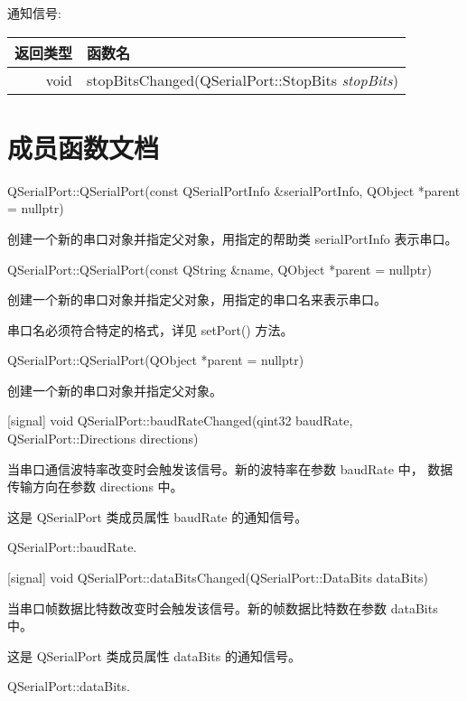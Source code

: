 通知信号:

\begin{tabular}{|r|l|}
\hline
返回类型 &	函数名 \\ 
\hline
void &	stopBitsChanged(QSerialPort::StopBits \emph{stopBits}) \\ 
\hline
\end{tabular}


\section{成员函数文档}

QSerialPort::QSerialPort(const QSerialPortInfo \&serialPortInfo, QObject *parent = nullptr)

创建一个新的串口对象并指定父对象，用指定的帮助类 serialPortInfo 表示串口。

QSerialPort::QSerialPort(const QString \&name, QObject *parent = nullptr)

创建一个新的串口对象并指定父对象，用指定的串口名来表示串口。

串口名必须符合特定的格式，详见 setPort() 方法。

QSerialPort::QSerialPort(QObject *parent = nullptr)

创建一个新的串口对象并指定父对象。

[signal] void QSerialPort::baudRateChanged(qint32 baudRate, QSerialPort::Directions directions)

当串口通信波特率改变时会触发该信号。新的波特率在参数 baudRate 中，
数据传输方向在参数 directions 中。

\begin{notice}
这是 QSerialPort 类成员属性 baudRate 的通知信号。
\end{notice}

\begin{seeAlso}
QSerialPort::baudRate.
\end{seeAlso}

[signal] void QSerialPort::dataBitsChanged(QSerialPort::DataBits dataBits)

当串口帧数据比特数改变时会触发该信号。新的帧数据比特数在参数 dataBits 中。

\begin{notice}
这是 QSerialPort 类成员属性 dataBits 的通知信号。
\end{notice}

\begin{seeAlso}
QSerialPort::dataBits.
\end{seeAlso}

